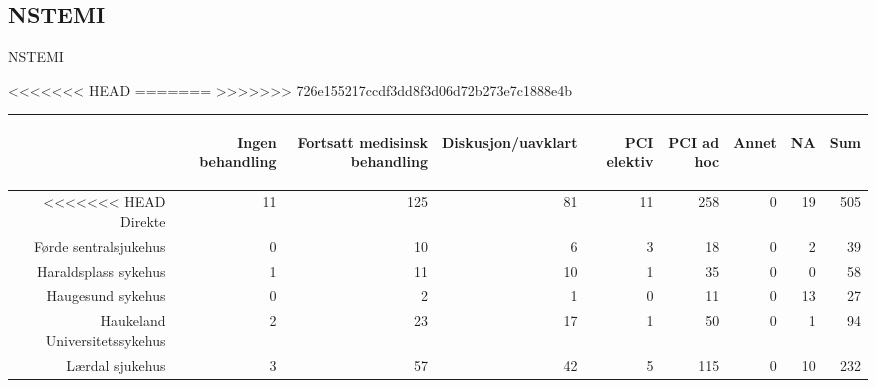 \documentclass[presentation,xcolor=pdftex,dvipsnames,table]{beamer}
\begin{document}
\subsection{NSTEMI}

\begin{frame}
\begin{Huge}
NSTEMI
\end{Huge}
\end{frame}


\begin{frame}
\begin{tiny}
<<<<<<< HEAD
=======
>>>>>>> 726e155217ccdf3dd8f3d06d72b273e7c1888e4b
\begin{table}[ht]
\centering
\begin{tabular}{rrrrrrrrr}
  \toprule
 & \begin{sideways} Ingen behandling \end{sideways} & \begin{sideways} Fortsatt medisinsk behandling \end{sideways} & \begin{sideways} Diskusjon/uavklart \end{sideways} & \begin{sideways} PCI elektiv \end{sideways} & \begin{sideways} PCI ad hoc \end{sideways} & \begin{sideways} Annet \end{sideways} & \begin{sideways} NA \end{sideways} & \begin{sideways} Sum \end{sideways} \\ 
  \midrule
<<<<<<< HEAD
Direkte & 11 & 125 & 81 & 11 & 258 & 0 & 19 & 505 \\ 
  Førde sentralsjukehus & 0 & 10 & 6 & 3 & 18 & 0 & 2 & 39 \\ 
  Haraldsplass sykehus & 1 & 11 & 10 & 1 & 35 & 0 & 0 & 58 \\ 
  Haugesund sykehus & 0 & 2 & 1 & 0 & 11 & 0 & 13 & 27 \\ 
  Haukeland Universitetssykehus & 2 & 23 & 17 & 1 & 50 & 0 & 1 & 94 \\ 
  Lærdal sjukehus & 3 & 57 & 42 & 5 & 115 & 0 & 10 & 232 \\ 

\end{tabular}
\end{table}
\end{tiny}
\end{frame}
\end{document}
